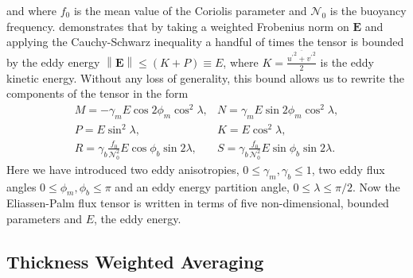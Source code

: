 \documentclass[10pt,a4paper]{report}
\newcommand*\mean[1]{\overline{#1}}
\newcommand*\res[1]{{#1}^{\prime}}
\begin{document}
                 and where $f_{0}$ is the mean value of the Coriolis parameter and $\mathcal{N}_{0}$ is the buoyancy frequency. \cite{marshall2012framework}
                demonstrates that by taking a weighted Frobenius norm on $\boldsymbol{E} $
                and applying the Cauchy-Schwarz inequality a handful of times the 
                 tensor is bounded by the eddy energy ${\left\|\boldsymbol{E}\right\|\leq\left(K+P\right)\equiv E}$,
                 where $K=\frac{\mean{{\res{u}}^{2} + {\res{v}}^{2}}}{2}$ is the eddy
                 kinetic energy.
                 Without any loss of generality, this bound allows us to rewrite the components of the tensor in the form
                 \begin{equation}
                 \begin{array}{cc}
                 M = -\gamma_{m}E\cos{2\phi_{m}}\cos^{2}{\lambda}, & 
                 N = \gamma_{m}E\sin{2\phi_{m}}\cos^{2}{\lambda}, \\
                 P =  E\sin^{2}{\lambda}, &  K =  E\cos^{2}{\lambda},  \\
                 R =  \gamma_{b}\frac{f_{0}}{\mathcal{N}_{0}^{2}}E\cos{\phi_{b}}\sin{2\lambda}, &
                 S = \gamma_{b}\frac{f_{0}}{\mathcal{N}_{0}^{2}}E\sin{\phi_{b}}\sin{2\lambda} .
                 \end{array} 
                 \end{equation}
                 Here we have introduced two eddy anisotropies, $0\leq\gamma_{m},\gamma_{b}\leq1$, two eddy flux angles $0\leq\phi_{m},\phi_{b}\leq\pi$ and an eddy energy partition angle,
                 $0\leq\lambda\leq\pi/2$. Now the Eliassen-Palm flux tensor
                 is written in terms of five non-dimensional, bounded parameters
                 and $E$, the eddy energy.
                 
                 
                 
                 \subsection{Thickness Weighted Averaging}
                 \label{youngtwa}
                 
\end{document}
